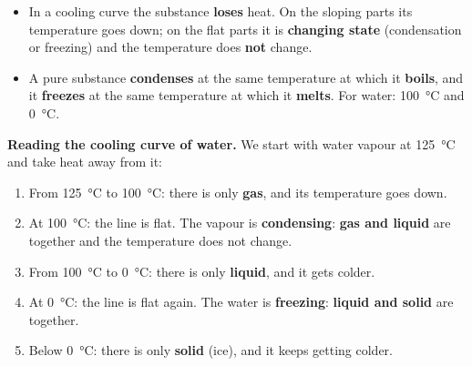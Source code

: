 \begin{impt}
    \begin{itemize}
        \item In a cooling curve the substance \textbf{loses} heat. On the sloping parts its temperature goes down; on the flat parts it is \textbf{changing state} (condensation or freezing) and the temperature does \textbf{not} change.
        \item A pure substance \textbf{condenses} at the same temperature at which it \textbf{boils}, and it \textbf{freezes} at the same temperature at which it \textbf{melts}. For water: \qty{100}{\celsius} and \qty{0}{\celsius}.
    \end{itemize}
\end{impt}

\begin{example}
    \textbf{Reading the cooling curve of water.} We start with water vapour at \qty{125}{\celsius} and take heat away from it:
    \begin{enumerate}[label=\numberballmDarkTeal]
        \item From \qty{125}{\celsius} to \qty{100}{\celsius}: there is only \textbf{gas}, and its temperature goes down.
        \item At \qty{100}{\celsius}: the line is flat. The vapour is \textbf{condensing}: \textbf{gas and liquid} are together and the temperature does not change.
        \item From \qty{100}{\celsius} to \qty{0}{\celsius}: there is only \textbf{liquid}, and it gets colder.
        \item At \qty{0}{\celsius}: the line is flat again. The water is \textbf{freezing}: \textbf{liquid and solid} are together.
        \item Below \qty{0}{\celsius}: there is only \textbf{solid} (ice), and it keeps getting colder.
    \end{enumerate}
\end{example}

